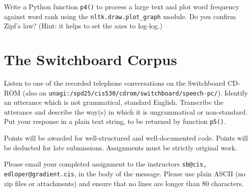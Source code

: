 \documentclass{cis530}
\begin{document}
Write a Python function \texttt{p4()}
to process a large text and plot word frequency
against word rank using the \texttt{nltk.draw.plot\_graph} module.
Do you confirm Zipf's law?  (Hint: it helps to
set the axes to log-log.)

\section{The Switchboard Corpus}

Listen to one of the recorded telephone conversations on the
Switchboard CD-ROM (also on
\texttt{unagi:/spd25/cis530/cdrom/switchboard/speech-pc/}).  Identify an
utterance which is not grammatical, standard English.  Transcribe the
utterance and describe the way(s) in which it is ungrammatical or
non-standard.  Put your response in a plain text string, to be returned
by function \texttt{p5()}.

Points will be awarded for well-structured and well-documented code.
Points will be deducted for late submissions.
Assignments must be strictly original work.

Please email your completed assignment to the instructors
\texttt{sb@cis, edloper@gradient.cis}, in the body of the message.
Please use plain ASCII (no zip files or attachments) and ensure
that no lines are longer than 80 characters.
\end{document}
